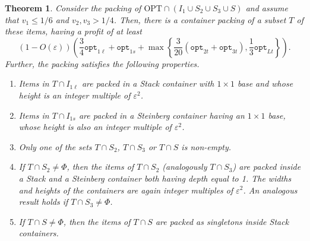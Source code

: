 \documentclass[10pt,a4paper]{amsart}
\newcommand{\deb}[1]{#1}
\renewcommand{\epsilon}{\varepsilon} %
\newtheorem{theorem}{Theorem}[section]
\theoremstyle{definition}
\newcommand{\optonel}{\mathtt{opt}_{1\ell}}
\newcommand{\optones}{\mathtt{opt}_{1s}}
\newcommand{\opttwot}{\mathtt{opt}_{2t}}
\newcommand{\optthreet}{\mathtt{opt}_{3t}}
\newcommand{\optlt}{\mathtt{opt}_{Lt}}
\begin{document}
\begin{theorem}
    Consider the packing of $\text{OPT}\cap \left(I_1\cup S_2\cup S_3\cup S\right)$ and assume that $v_1\le 1/6$ and $v_2,v_3>1/4$. Then, there is a container packing of a subset $T$ of these items, having a profit of at least 
    \[ (1-O(\epsilon))\left(\frac{3}{4}\optonel+\optones+\max\left\{\frac{3}{20}(\opttwot+\optthreet),\frac{1}{3}\optlt\right\}\right). \] 
    Further, the packing satisfies the following properties.
    \begin{enumerate}
        \item Items in $T\cap I_{1\ell}$ are packed in a Stack container with $1\times 1$ base and whose height is an integer multiple of $\epsilon^2$.
        \item Items in $T\cap I_{1s}$ are packed in a Steinberg container having an $1\times 1$ base, whose height is also an integer multiple of $\epsilon^2$.
        \item \deb{Only one of the sets $T\cap S_2$, $T\cap S_3$ or $T\cap S$ is non-empty.}    
        \item If $T\cap S_2 \neq \Phi$, then the items of $T\cap S_2$ (analogously $T\cap S_3$) are packed inside a Stack and a Steinberg container both having depth equal to 1. The widths and heights of the containers are again integer multiples of $\epsilon^2$. An analogous result holds if $T\cap S_3 \neq \Phi$.
        \item If $T\cap S \neq \Phi$, then the items of $T\cap S$ are packed as singletons inside Stack containers.
    \end{enumerate}
\end{theorem}
\end{document}

